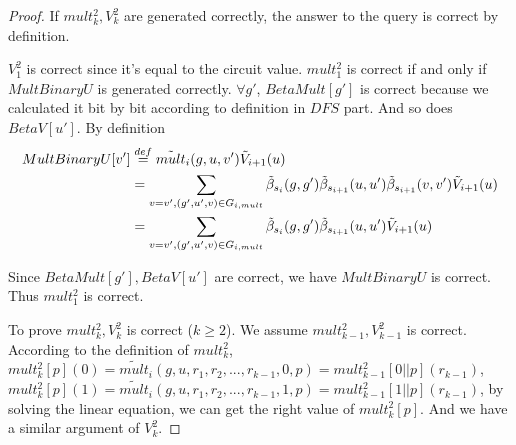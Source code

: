 {\begin{proof}
		If $mult_k^2, V_k^2$ are generated correctly, the answer to the query is correct by definition.
		
		$V_1^2$ is correct since it's equal to the circuit value. $mult_1^2$ is correct if and only if $MultBinaryU$ is generated correctly. $\forall g'$, $BetaMult[g']$ is correct because we calculated it bit by bit according to definition in $DFS$ part. And so does $BetaV[u']$. By definition 
		\begin{align*}
		MultBinaryU[v']&\overset{def}{=}\tilde{mult}_{i}(g, u, v')\tilde{V}_{i+1}(u)
		\\&=\sum_{v=v', (g', u', v) \in G_{i, mult}}\tilde{\beta}_{s_{i}}(g, g')\tilde{\beta}_{s_{i+1}}(u, u')\tilde{\beta}_{s_{i+1}}(v, v')\tilde{V}_{i+1}(u)
		\\&=\sum_{v=v', (g', u', v) \in G_{i, mult}}\tilde{\beta}_{s_{i}}(g, g')\tilde{\beta}_{s_{i+1}}(u, u')\tilde{V}_{i+1}(u)
		\end{align*}
		
		Since $BetaMult[g'], BetaV[u']$ are correct, we have $MultBinaryU$ is correct. Thus $mult_1^2$ is correct.
		
		To prove $mult_k^2, V_k^2$ is correct ($k \ge 2$). We assume $mult_{k-1}^2, V_{k-1}^2$ is correct. According to the definition of $mult_k^2$, $mult_k^2[p](0)=\tilde{mult}_i(g, u, {r_1, r_2,...,r_{k-1}, 0, p})=mult_{k-1}^2[0||p](r_{k-1})$, $mult_k^2[p](1)=\tilde{mult}_i(g, u, {r_1, r_2,...,r_{k-1}, 1, p})=mult_{k-1}^2[1||p](r_{k-1})$, by solving the linear equation, we can get the right value of $mult_k^2[p]$. And we have a similar argument of $V_k^2$.
	\end{proof}
}
